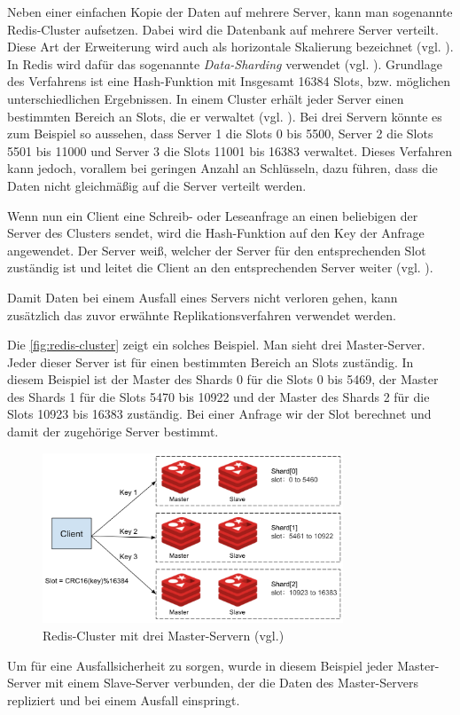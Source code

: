 Neben einer einfachen Kopie der Daten auf mehrere Server, kann man sogenannte Redis-Cluster aufsetzen. Dabei wird die Datenbank auf mehrere Server verteilt.
Diese Art der Erweiterung wird auch als horizontale Skalierung bezeichnet (vgl. \cite{Fasel2016}).
In Redis wird dafür das sogenannte \textit{Data-Sharding} verwendet (vgl. \cite{Redis-Docs-Scaling}).
\newpage
Grundlage des Verfahrens ist eine Hash-Funktion mit Insgesamt 16384 Slots, bzw. möglichen unterschiedlichen Ergebnissen.
In einem Cluster erhält jeder Server einen bestimmten Bereich an Slots, die er verwaltet (vgl. \cite{Redis-Docs-Scaling}).
Bei drei Servern könnte es zum Beispiel so aussehen, dass Server 1 die Slots 0 bis 5500, Server 2 die Slots 5501 bis 11000 und Server 3 die Slots 11001 bis 16383 verwaltet.
Dieses Verfahren kann jedoch, vorallem bei geringen Anzahl an Schlüsseln, dazu führen, dass die Daten nicht gleichmäßig auf die Server verteilt werden. 

Wenn nun ein Client eine Schreib- oder Leseanfrage an einen beliebigen der Server des Clusters sendet, wird die Hash-Funktion auf den Key der Anfrage angewendet.
Der Server weiß, welcher der Server für den entsprechenden Slot zuständig ist und leitet die Client an den entsprechenden Server weiter (vgl. \cite{Redis-Docs-Scaling}).

Damit Daten bei einem Ausfall eines Servers nicht verloren gehen, kann zusätzlich das zuvor erwähnte Replikationsverfahren verwendet werden.


Die \autoref{fig:redis-cluster} zeigt ein solches Beispiel.
Man sieht drei Master-Server. Jeder dieser Server ist für einen bestimmten Bereich an Slots zuständig.
In diesem Beispiel ist der Master des Shards 0 für die Slots 0 bis 5469, der Master des Shards 1 für die Slots 5470 bis 10922 und der Master des Shards 2 für die Slots 10923 bis 16383 zuständig.
Bei einer Anfrage wir der Slot berechnet und damit der zugehörige Server bestimmt. 

\begin{figure}[h]
	\centering
	\includegraphics[width=0.8\textwidth]{images/redis-cluster.png}
	\caption{Redis-Cluster mit drei Master-Servern (vgl.\cite{aeraki})}
	\label{fig:redis-cluster} 
\end{figure}

Um für eine Ausfallsicherheit zu sorgen, wurde in diesem Beispiel jeder Master-Server mit einem Slave-Server verbunden, der die Daten des Master-Servers repliziert und bei einem Ausfall einspringt.






